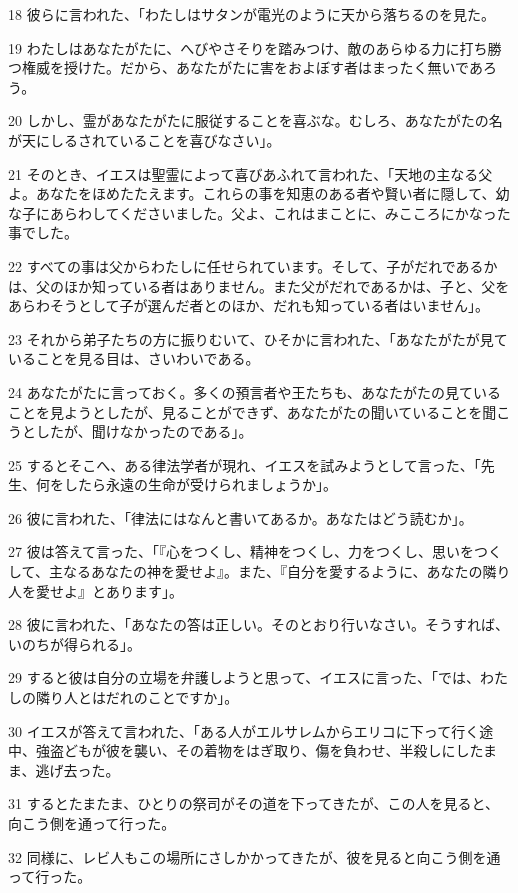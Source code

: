 \par 18 彼らに言われた、「わたしはサタンが電光のように天から落ちるのを見た。
\par 19 わたしはあなたがたに、へびやさそりを踏みつけ、敵のあらゆる力に打ち勝つ権威を授けた。だから、あなたがたに害をおよぼす者はまったく無いであろう。
\par 20 しかし、霊があなたがたに服従することを喜ぶな。むしろ、あなたがたの名が天にしるされていることを喜びなさい」。
\par 21 そのとき、イエスは聖霊によって喜びあふれて言われた、「天地の主なる父よ。あなたをほめたたえます。これらの事を知恵のある者や賢い者に隠して、幼な子にあらわしてくださいました。父よ、これはまことに、みこころにかなった事でした。
\par 22 すべての事は父からわたしに任せられています。そして、子がだれであるかは、父のほか知っている者はありません。また父がだれであるかは、子と、父をあらわそうとして子が選んだ者とのほか、だれも知っている者はいません」。
\par 23 それから弟子たちの方に振りむいて、ひそかに言われた、「あなたがたが見ていることを見る目は、さいわいである。
\par 24 あなたがたに言っておく。多くの預言者や王たちも、あなたがたの見ていることを見ようとしたが、見ることができず、あなたがたの聞いていることを聞こうとしたが、聞けなかったのである」。
\par 25 するとそこへ、ある律法学者が現れ、イエスを試みようとして言った、「先生、何をしたら永遠の生命が受けられましょうか」。
\par 26 彼に言われた、「律法にはなんと書いてあるか。あなたはどう読むか」。
\par 27 彼は答えて言った、「『心をつくし、精神をつくし、力をつくし、思いをつくして、主なるあなたの神を愛せよ』。また、『自分を愛するように、あなたの隣り人を愛せよ』とあります」。
\par 28 彼に言われた、「あなたの答は正しい。そのとおり行いなさい。そうすれば、いのちが得られる」。
\par 29 すると彼は自分の立場を弁護しようと思って、イエスに言った、「では、わたしの隣り人とはだれのことですか」。
\par 30 イエスが答えて言われた、「ある人がエルサレムからエリコに下って行く途中、強盗どもが彼を襲い、その着物をはぎ取り、傷を負わせ、半殺しにしたまま、逃げ去った。
\par 31 するとたまたま、ひとりの祭司がその道を下ってきたが、この人を見ると、向こう側を通って行った。
\par 32 同様に、レビ人もこの場所にさしかかってきたが、彼を見ると向こう側を通って行った。
